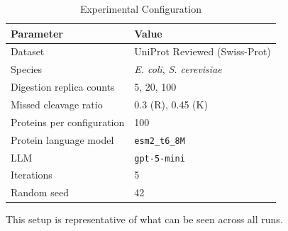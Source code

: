 \begin{table}[!tb]
\caption{Experimental Configuration}
\label{tab:config}
\centering
\small
\setlength{\tabcolsep}{4pt}
\begin{tabular}{@{}ll@{}}
\hline
\textbf{Parameter} & \textbf{Value} \\
\hline
Dataset & UniProt Reviewed (Swiss-Prot) \\
Species & \textit{E. coli}, \textit{S. cerevisiae} \\
Digestion replica counts & 5, 20, 100 \\
Missed cleavage ratio & 0.3 (R), 0.45 (K) \\
Proteins per configuration & 100 \\
Protein language model & \texttt{esm2\_t6\_8M} \\
LLM & \texttt{gpt-5-mini} \\
Iterations & 5 \\
Random seed & 42 \\
\hline
\end{tabular}
\par\smallskip\footnotesize{This setup is representative of what can be seen across all runs.}
\end{table}
